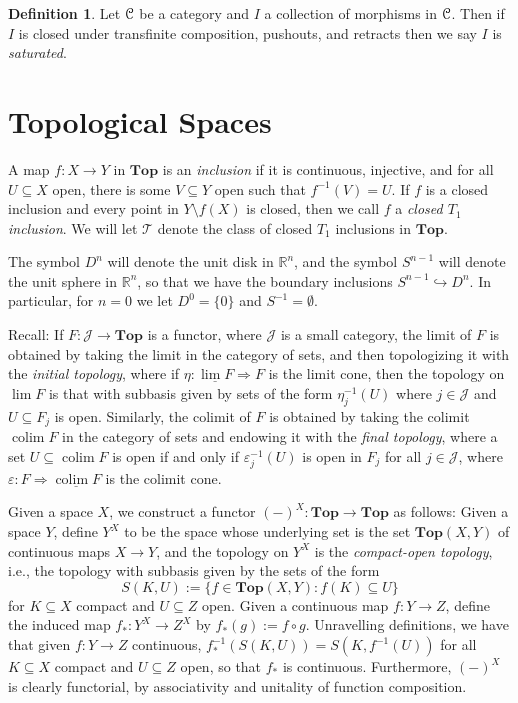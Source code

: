 \documentclass{amsart}
\theoremstyle{plain}
\theoremstyle{definition}
\newtheorem{definition}[theorem]{Definition}
\newcommand{\Top}{\mbf{Top}}
\newcommand{\sseq}{\subseteq}
\newcommand{\0}{\mathbf{0}}
\newcommand{\bR}{\mathbb{R}}
\newcommand{\cC}{\mathcal C}
\newcommand{\cJ}{\mathcal J}
\newcommand{\into}{\hookrightarrow}
\newcommand{\cT}{\mathcal T}
\newcommand{\mbf}[1]{\mathbf{#1}}
\newcommand{\vare}{\varepsilon}
\renewcommand{\(}{\left(}
\renewcommand{\)}{\right)}
\def\scr{\EuScript}
\def\cC{\scr{C}}
\DeclareMathOperator*{\colim}{colim}
\begin{document}
\begin{definition}\label{saturated}
  Let $\cC$ be a category and $I$ a collection of morphisms in $\cC$. Then if $I$ is closed under transfinite composition, pushouts, and retracts then we say $I$ is \textit{saturated}.
\end{definition}

\section{Topological Spaces}

A map $f:X\to Y$ in $\Top$ is an \textit{inclusion} if it is continuous, injective, and for all $U\sseq X$ open, there is some $V\sseq Y$ open such that $f^{-1}(V)=U$. If $f$ is a closed inclusion and every point in $Y\setminus f(X)$ is closed, then we call $f$ a \textit{closed $T_1$ inclusion}. We will let $\cT$ denote the class of closed $T_1$ inclusions in $\Top$.

The symbol $D^n$ will denote the unit disk in $\bR^n$, and the symbol $S^{n-1}$ will denote the unit sphere in $\bR^n$, so that we have the boundary inclusions $S^{n-1}\into D^n$. In particular, for $n=0$ we let $D^0=\{0\}$ and $S^{-1}=\emptyset$.

Recall: If $F:\cJ\to\Top$ is a functor, where $\cJ$ is a small category, the limit of $F$ is obtained by taking the limit in the category of sets, and then topologizing it with the \textit{initial topology}, where if $\eta:\underline{\lim F}\Rightarrow F$ is the limit cone, then the topology on $\lim F$ is that with subbasis given by sets of the form $\eta_j^{-1}(U)$ where $j\in\cJ$ and $U\sseq F_j$ is open. Similarly, the colimit of $F$ is obtained by taking the colimit $\colim F$ in the category of sets and endowing it with the \textit{final topology}, where a set $U\sseq\colim F$ is open if and only if $\vare_j^{-1}(U)$ is open in $F_j$ for all $j\in\cJ$, where $\vare:F\Rightarrow\underline{\colim F}$ is the colimit cone.

Given a space $X$, we construct a functor $(-)^X:\Top\to\Top$ as follows: Given a space $Y$, define $Y^X$ to be the space whose underlying set is the set $\Top(X,Y)$ of continuous maps $X\to Y$, and the topology on $Y^X$ is the \textit{compact-open topology}, i.e., the topology with subbasis given by the sets of the form 
\[S(K,U):=\{f\in\Top(X,Y):f(K)\sseq U\}\]
for $K\sseq X$ compact and $U\sseq Z$ open. Given a continuous map $f:Y\to Z$, define the induced map $f_*:Y^X\to Z^X$ by $f_*(g):=f\circ g$. Unravelling definitions, we have that given $f:Y\to Z$ continuous, $f_*^{-1}(S(K,U))=S(K,f^{-1}(U))$ for all $K\sseq X$ compact and $U\sseq Z$ open, so that $f_*$ is continuous. Furthermore, $(-)^X$ is clearly functorial, by associativity and unitality of function composition.
\end{document}
